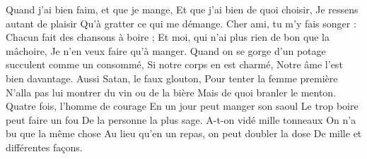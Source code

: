 \footnotemark 
[ititle={Chanson à manger}]


\beginverse
Quand j'ai bien faim, et que je mange,
Et que j'ai bien de quoi choisir,
Je ressens autant de plaisir
Qu'à gratter ce qui me démange.
Cher ami, tu m'y fais songer :
Chacun fait des chansons à boire ;
Et moi, qui n'ai plus rien de bon que la mâchoire,
Je n'en veux faire qu'à manger.
\endverse
\beginverse
Quand on se gorge d'un potage
succulent comme un consommé,
Si notre corps en est charmé,
Notre âme l'est bien davantage.
Aussi Satan, le faux glouton,
Pour tenter la femme première
N'alla pas lui montrer du vin ou de la bière
Mais de quoi branler le menton.
\endverse
\beginverse
Quatre fois, l'homme de courage
En un jour peut manger son saoul
Le trop boire peut faire un fou
De la personne la plus sage.
A-t-on vidé mille tonneaux
On n'a bu que la même chose
Au lieu qu'en un repas, on peut doubler la dose
De mille et différentes façons.
\endverse
\endsong

